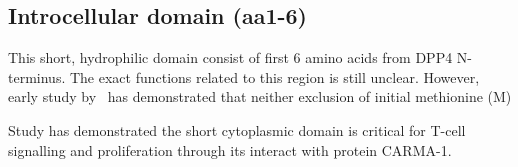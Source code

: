 \subsection{Introcellular domain (aa1-6)}

This short, hydrophilic domain consist of first 6 amino acids from DPP4 N-terminus. The exact functions related to this region is still unclear. However, early study by~\citet{Hong1990} has demonstrated that neither exclusion of initial methionine (M)

Study has demonstrated the short cytoplasmic domain is critical for T-cell signalling and proliferation through its interact with protein CARMA-1. \cite{Ohnuma_2007}